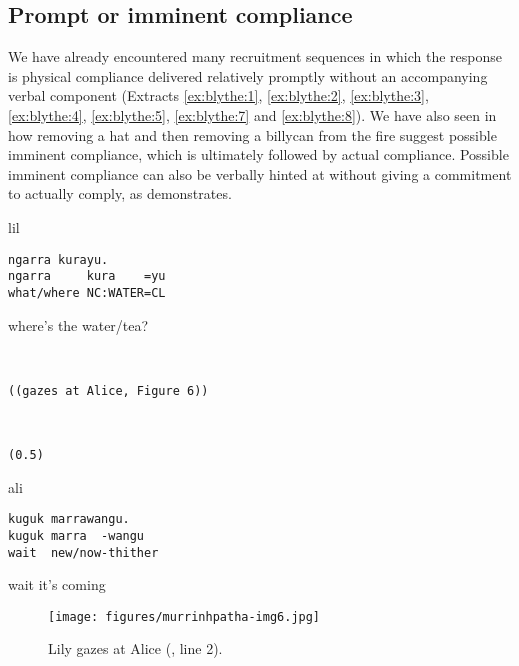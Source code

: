 \documentclass[output=paper,nonflat,colorlinks,citecolor=brown]{langsci/langscibook}
\begin{document}
\subsection{Prompt or imminent compliance}

We have already encountered many recruitment sequences in which the response is physical compliance delivered relatively promptly without an accompanying verbal component (Extracts \ref{ex:blythe:1}, \ref{ex:blythe:2}, \ref{ex:blythe:3}, \ref{ex:blythe:4}, \ref{ex:blythe:5}, \ref{ex:blythe:7} and \ref{ex:blythe:8}). We have also seen in  how removing a hat and then removing a billycan from the fire suggest possible imminent compliance, which is ultimately followed by actual compliance. Possible imminent compliance can also be verbally hinted at without giving a commitment to actually comply, as  demonstrates.

\vspace{-1mm}
%
\begin{mdframednoverticalspace}[style=firstfoc]
\begin{transbox}{1}{lil}
\begin{verbatim}
ngarra kurayu.
ngarra     kura    =yu
what/where NC:WATER=CL
\end{verbatim}
where's the water/tea?
\end{transbox}
\end{mdframednoverticalspace}
%
\begin{transbox}{2}{~}
\begin{verbatim}
((gazes at Alice, Figure 6))
\end{verbatim}
\end{transbox}
%
\begin{transbox}{3}{~}
\begin{verbatim}
(0.5)
\end{verbatim}
\end{transbox}
%
\begin{mdframednoverticalspace}[style=secondfoc]
\begin{transbox}{4}{ali}
\begin{verbatim}
kuguk marrawangu.
kuguk marra  -wangu
wait  new/now-thither
\end{verbatim}
wait it's coming
\end{transbox}
\end{mdframednoverticalspace}
%
\begin{figure}
\texttt{[image: figures/murrinhpatha-img6.jpg]}
\caption{Lily gazes at Alice (, line 2).}
\label{fig:blythe:6}
\end{figure}
\end{document}
